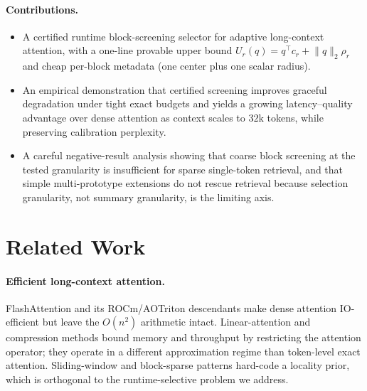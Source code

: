 \documentclass[11pt]{article}
\theoremstyle{plain}
\theoremstyle{definition}
\newcommand{\ur}{U_r}
\newcommand{\normq}{\lVert q \rVert_2}
\newcommand{\rad}{\rho_r}
\begin{document}
\paragraph{Contributions.}
\begin{itemize}[leftmargin=1.4em,topsep=2pt,itemsep=1pt]
\item A certified runtime block-screening selector for adaptive long-context
      attention, with a one-line provable upper bound $\ur(q) = q^{\top} c_r + \normq \rad$
      and cheap per-block metadata (one center plus one scalar radius).
\item An empirical demonstration that certified screening improves graceful
      degradation under tight exact budgets and yields a growing
      latency--quality advantage over dense attention as context scales to
      $32\mathrm{k}$ tokens, while preserving calibration perplexity.
\item A careful negative-result analysis showing that coarse block screening
      at the tested granularity is insufficient for sparse single-token
      retrieval, and that simple multi-prototype extensions do not rescue
      retrieval because selection granularity, not summary granularity, is
      the limiting axis.
\end{itemize}

\section{Related Work}

\paragraph{Efficient long-context attention.}
FlashAttention \citep{dao2022flashattention} and its ROCm/AOTriton
descendants make dense attention IO-efficient but leave the $O(n^2)$
arithmetic intact. Linear-attention and compression methods
\citep{wang2020linformer} bound memory and throughput by restricting the
attention operator; they operate in a different approximation regime than
token-level exact attention. Sliding-window and block-sparse patterns
\citep{beltagy2020longformer, zaheer2020bigbird} hard-code a locality prior,
which is orthogonal to the runtime-selective problem we address.
\end{document}
